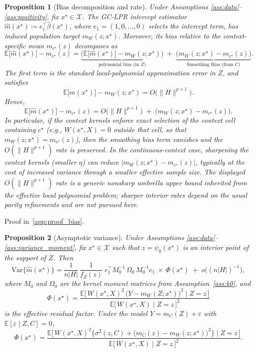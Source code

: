 \documentclass[final,1p,times,authoryear]{elsarticle}
\newtheorem{proposition}{Proposition}
\begin{document}
\begin{proposition}[Bias decomposition and rate]
\label{prop:bias}
Under Assumptions \ref{ass:data}--\ref{ass:positivity}, fix \(x^\star\in\mathcal{X}\). The GC-LPR intercept estimator
\(\hat m(x^\star)\coloneqq e_1^\top \hat\beta(x^\star)\), where \(e_1=(1,0,\dots,0)\) selects the intercept term,
has induced population target \(m_W(z;x^\star)\). Moreover, its bias relative to the
context-specific mean \(m_{c^\star}(z)\) decomposes as
\[
\mathbb{E}\big[\hat m(x^\star)\big]-m_{c^\star}(z)
=
\underbrace{\Big(\mathbb{E}\big[\hat m(x^\star)\big]-m_W(z;x^\star)\Big)}_{\text{polynomial bias (in \(Z\))}}
\;+\;
\underbrace{\Big(m_W(z;x^\star)-m_{c^\star}(z)\Big)}_{\text{Smoothing Bias (from \(C\))}}.
\]
The first term is the standard local-polynomial approximation error in \(Z\), and satisfies
\[
\mathbb{E}\big[\hat m(x^\star)\big]-m_W(z;x^\star)
=O\!\big(\|H\|^{p+1}\big).
\]
Hence,
\[
\mathbb{E}\big[\hat m(x^\star)\big]-m_{c^\star}(z)
=
O\!\big(\|H\|^{p+1}\big)\;+\;\Big(m_W(z;x^\star)-m_{c^\star}(z)\Big).
\]
In particular, if the context kernels enforce exact selection of the context cell containing \(c^\star\)
(e.g., \(W(x^\star,X)=0\) outside that cell, so that \(m_W(z;x^\star)=m_{c^\star}(z)\)), then the smoothing bias
term vanishes and the \(O(\|H\|^{p+1})\) rate is preserved. In the continuous-context case, sharpening the
context kernels (smaller \(\eta\)) can reduce \(\big|m_W(z;x^\star)-m_{c^\star}(z)\big|\), typically at the
cost of increased variance through a smaller effective sample size.
The displayed \(O(\|H\|^{p+1})\) rate is a generic nonsharp umbrella upper bound inherited from the effective local polynomial problem; sharper interior rates depend on the usual parity refinements and are not pursued here.
\end{proposition}
Proof in~\ref{app:proof_bias}.


\begin{proposition}[Asymptotic variance]
\label{prop:variance}
Under Assumptions \ref{ass:data}--\ref{ass:variance_moment}, fix \(x^\star\in\mathcal{X}\) such that \(z=\psi_0(x^\star)\) is an interior point of the support of \(Z\). Then
\[
\mathrm{Var}\{\hat m(x^\star)\}
=
\frac{1}{n|H|}\,\frac{1}{f_Z(z)}\;
e_1^\top M_0^{-1}\,\Omega_0\,M_0^{-1} e_1\ \times\ \Phi(x^\star)
\;+\;o\!\big((n|H|)^{-1}\big),
\]
where \(M_0\) and \(\Omega_0\) are the kernel moment matrices from Assumption~\ref{ass:k0}, and
\[
\Phi(x^\star)=\frac{\mathbb{E}\big[\,W(x^\star,X)^2\,\big(Y-m_W(Z;x^\star)\big)^2\mid Z=z\,\big]}
{\mathbb{E}\big[\,W(x^\star,X)\mid Z=z\,\big]^2}
\]
is the effective residual factor. Under the model \(Y=m_C(Z)+\varepsilon\) with \(\mathbb{E}[\varepsilon\mid Z,C]=0\),
\[
\Phi(x^\star)=
\frac{\mathbb{E}\big[\,W(x^\star,X)^2\big\{\sigma^2(z,C)+\big(m_C(z)-m_W(z;x^\star)\big)^2\big\}\mid Z=z\,\big]}
{\mathbb{E}\big[\,W(x^\star,X)\mid Z=z\,\big]^2}.
\]
\end{proposition}
\end{document}
